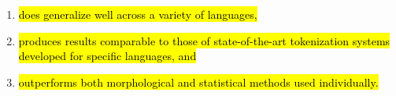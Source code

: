 \begin{enumerate}
\item \hl{does generalize well across a variety of languages,}
\item \hl{produces results comparable to those of state-of-the-art
tokenization systems developed for specific languages, and}
\item \hl{outperforms both morphological and statistical methods used individually.}
\end{enumerate}